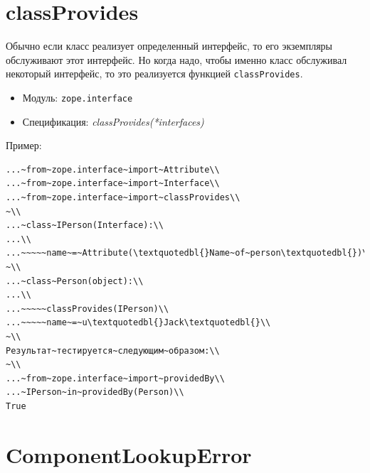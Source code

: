 \documentclass[a4paper,openany,twoside,draft]{book}
\providecommand*{\DUroletitlereference}[1]{\textsl{#1}}
\begin{document}
\section*{classProvides%
  \label{classprovides}%
}

Обычно если класс реализует определенный интерфейс, то его экземпляры
обслуживают этот интерфейс.  Но когда надо, чтобы именно класс
обслуживал некоторый интерфейс, то это реализуется функцией
\texttt{classProvides}.

\begin{itemize}

\item Модуль: \texttt{zope.interface}

\item Спецификация: \DUroletitlereference{classProvides(*interfaces)}

\end{itemize}

Пример:

\begin{verbatim}
...~from~zope.interface~import~Attribute\\
...~from~zope.interface~import~Interface\\
...~from~zope.interface~import~classProvides\\
~\\
...~class~IPerson(Interface):\\
...\\
...~~~~~name~=~Attribute(\textquotedbl{}Name~of~person\textquotedbl{})\\
~\\
...~class~Person(object):\\
...\\
...~~~~~classProvides(IPerson)\\
...~~~~~name~=~u\textquotedbl{}Jack\textquotedbl{}\\
~\\
Результат~тестируется~следующим~образом:\\
~\\
...~from~zope.interface~import~providedBy\\
...~IPerson~in~providedBy(Person)\\
True
\end{verbatim}


\section*{ComponentLookupError%
  \label{componentlookuperror}%
}
\end{document}
